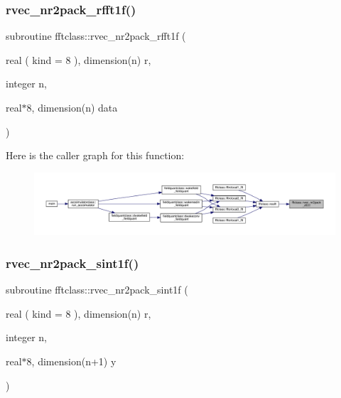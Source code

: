 \subsubsection{\texorpdfstring{rvec\_nr2pack\_rfft1f()}{rvec\_nr2pack\_rfft1f()}}
{\footnotesize\ttfamily subroutine fftclass\+::rvec\+\_\+nr2pack\+\_\+rfft1f (\begin{DoxyParamCaption}\item[{real ( kind = 8 ), dimension(n)}]{r,  }\item[{integer}]{n,  }\item[{real$\ast$8, dimension(n)}]{data }\end{DoxyParamCaption})}

Here is the caller graph for this function\+:\nopagebreak
\begin{figure}[H]
\begin{center}
\leavevmode
\includegraphics[width=350pt]{namespacefftclass_ac09ed442a8bb7846768adbe2d5c798c6_icgraph}
\end{center}
\end{figure}
\mbox{\label{namespacefftclass_ae1f9bdd4e66db530852187dff115ae36}} 
\subsubsection{\texorpdfstring{rvec\_nr2pack\_sint1f()}{rvec\_nr2pack\_sint1f()}}
{\footnotesize\ttfamily subroutine fftclass\+::rvec\+\_\+nr2pack\+\_\+sint1f (\begin{DoxyParamCaption}\item[{real ( kind = 8 ), dimension(n)}]{r,  }\item[{integer}]{n,  }\item[{real$\ast$8, dimension(n+1)}]{y }\end{DoxyParamCaption})}

